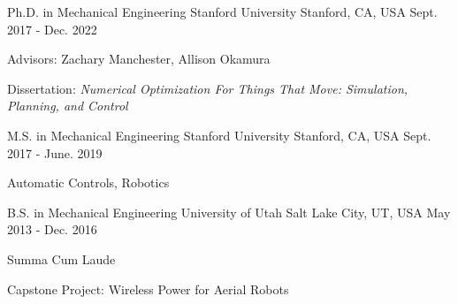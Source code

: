 

\begin{cventries}

  \cventry
    {Ph.D. in Mechanical Engineering} %
    {Stanford University} %
    {Stanford, CA, USA} %
    {Sept. 2017 - Dec. 2022} %
    {
      \begin{cvitems} %
        \item {Advisors: Zachary Manchester, Allison Okamura}
        \item{Dissertation: \textit{Numerical Optimization For Things That Move: Simulation, Planning, and Control}}
      \end{cvitems}
    }
    
  \cventry
    {M.S. in Mechanical Engineering} %
    {Stanford University} %
    {Stanford, CA, USA} %
    {Sept. 2017 - June. 2019} %
    {
      \begin{cvitems} %
        \item {Automatic Controls, Robotics}
      \end{cvitems}
    }
    
  \cventry
    {B.S. in Mechanical Engineering} %
    {University of Utah} %
    {Salt Lake City, UT, USA} %
    {May 2013 - Dec. 2016} %
    {
      \begin{cvitems} %
        \item {Summa Cum Laude}
        \item {Capstone Project: Wireless Power for Aerial Robots}
      \end{cvitems}
    }

\end{cventries}

